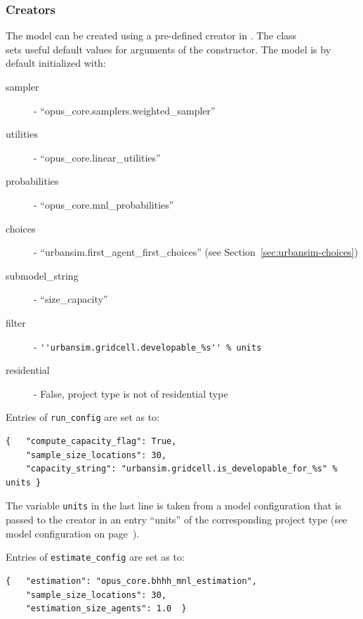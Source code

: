 \subsubsection{Creators}
%
The model can be created using a pre-defined creator in .
The class\\
sets useful default
values for arguments of the constructor. The model is by default initialized with:
\begin{description}
\item[sampler] - ``opus_core.samplers.weighted_sampler''
\item[utilities] - ``opus_core.linear_utilities''
\item[probabilities] - ``opus_core.mnl_probabilities''
\item[choices] - ``urbansim.first_agent_first_choices'' (see
  Section~\ref{sec:urbansim-choices})
\item[submodel_string] - ``size_capacity''
\item[filter] - \verb|''urbansim.gridcell.developable_%s'' % units|
\item[residential] - False, project type is not of residential type
\end{description}
Entries of \verb|run_config| are set as to:
\begin{verbatim}
{   "compute_capacity_flag": True,
    "sample_size_locations": 30,
    "capacity_string": "urbansim.gridcell.is_developable_for_%s" % units }
\end{verbatim}
The variable \verb|units| in the last line is taken from a model configuration
that is passed to the creator in an entry ``units'' of the corresponding
project type (see model configuration on
page~\pageref{page:model-configuration}).

Entries of \verb|estimate_config| are set as to:
\begin{verbatim}
{   "estimation": "opus_core.bhhh_mnl_estimation",
    "sample_size_locations": 30,
    "estimation_size_agents": 1.0  }
\end{verbatim}



